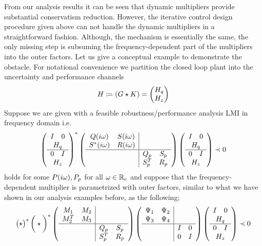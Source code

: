 From our analysis results it can be seen that dynamic multipliers provide substantial conservatism reduction. However,
the iterative control design procedure given above can not handle the dynamic multipliers in a straightforward 
fashion. Although, the mechanism is essentially the same, the only missing step is subsuming the frequency-dependent
part of the multipliers into the outer factors. Let us give a conceptual example to demonstrate the obstacle. For
notational convenience we partition the closed loop plant into the uncertainty and performance channels
\[
H \coloneqq (G\star K) = \begin{pmatrix}H_q\\H_z\end{pmatrix}
\]
Suppose we are given with a feasible robustness/performance analysis LMI in frequency domain i.e.
\[
\left(
\begin{array}{cc}
	I &0\\
	\multicolumn{2}{c}{H_q}\\\hline
	0& I\\
	\multicolumn{2}{c}{H_z}
\end{array}
\right)^*
\left(
\begin{array}{cc|cc}
Q(\iw)&S(\iw)&&\\S^*(\iw)&R(\iw)&&\\\hline &&Q_p&S_p\\&&S_p^T&R_p
\end{array}
\right)
\left(
\begin{array}{cc}
	I &0\\
	\multicolumn{2}{c}{H_q}\\\hline
	0& I\\
	\multicolumn{2}{c}{H_z}
\end{array}
\right) \prec 0
\]
holds for some $P(i\omega),P_p$ for all $\omega\in\mathbb{R}_e$ and suppose that the frequency-dependent multiplier is parametrized with 
outer factors, similar to what we have shown in our analysis examples before, as the following;
\[
\pmatr{\star}^*
\bigg(
\star
\bigg)^*
\left(
\begin{array}{cc|cc}
M_1&M_2&&\\M^T_2&M_3&&\\\hline &&Q_p&S_p\\&&S_p^T&R_p
\end{array}
\right)
\left(
\begin{array}{cc|cc}
	\Psi_1&\Psi_2&&\\ \Psi_3&\Psi_4&&\\\hline &&I&0\\&&0&I
\end{array}
\right)
\left(
\begin{array}{cc}
	I &0\\
	\multicolumn{2}{c}{H_q}\\\hline
	0& I\\
	\multicolumn{2}{c}{H_z}
\end{array}
\right)
\prec 0
\]
